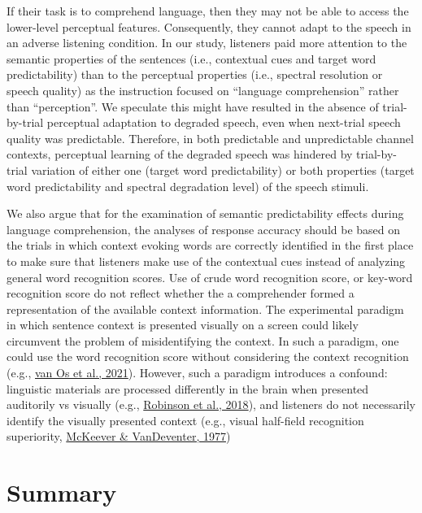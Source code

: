 \documentclass[a4paper, nobind]{templates/ociamthesis}
\begin{document}
If their task is to comprehend language, then they may not be able to access the lower-level perceptual features.
Consequently, they cannot adapt to the speech in an adverse listening condition.
In our study, listeners paid more attention to the semantic properties of the sentences (i.e., contextual cues and target word predictability) than to the perceptual properties (i.e., spectral resolution or speech quality) as the instruction focused on ``language comprehension'' rather than ``perception''.
We speculate this might have resulted in the absence of trial- by-trial perceptual adaptation to degraded speech, even when next-trial speech quality was predictable.
Therefore, in both predictable and unpredictable channel contexts, perceptual learning of the degraded speech was hindered by trial-by-trial variation of either one (target word predictability) or both properties (target word predictability and spectral degradation level) of the speech stimuli.

We also argue that for the examination of semantic predictability effects during language comprehension, the analyses of response accuracy should be based on the trials in which context evoking words are correctly identified in the first place to make sure that listeners make use of the contextual cues instead of analyzing general word recognition scores.
Use of crude word recognition score, or key-word recognition score do not reflect whether the a comprehender formed a representation of the available context information.
The experimental paradigm in which sentence context is presented visually on a screen could likely circumvent the problem of misidentifying the context.
In such a paradigm, one could use the word recognition score without considering the context recognition (e.g., \protect\hyperlink{ref-vanOs2021}{van Os et al., 2021}).
However, such a paradigm introduces a confound:
linguistic materials are processed differently in the brain when presented auditorily vs visually (e.g., \protect\hyperlink{ref-Robinson2018}{Robinson et al., 2018}),
and listeners do not necessarily identify the visually presented context (e.g., visual half-field recognition superiority, \protect\hyperlink{ref-McKeever1977}{McKeever \& VanDeventer, 1977})

\hypertarget{summary-3}{%
\section{Summary}\label{summary-3}}
\end{document}
